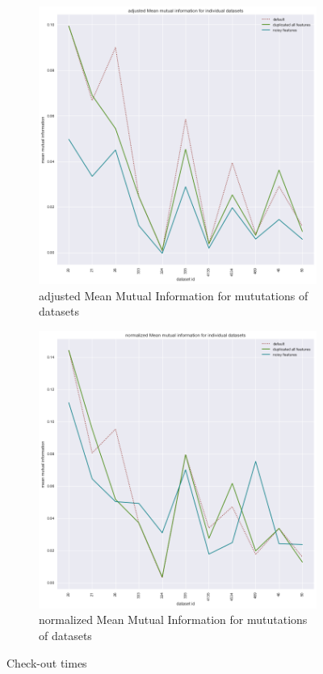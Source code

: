 \documentclass[a4paper,10pt]{article}
\begin{document}
\begin{figure}[H]
\begin{subfigure}[b]{0.45\textwidth}
		\includegraphics[width=\textwidth]{images/adjustedMeanMutualInformation.png}
		\caption{adjusted Mean Mutual Information for mututations of datasets}
		\label{fig:AMMI}
	\end{subfigure}
	\begin{subfigure}[b]{0.45\textwidth}
		\includegraphics[width=\textwidth]{images/normalizedMeanMutualInformation.png}
		\caption{normalized Mean Mutual Information for mututations of datasets}
		\label{fig:NMMI}
	\end{subfigure}
	\caption{Check-out times}\label{fig:MMIs}
\end{figure}
\end{document}
